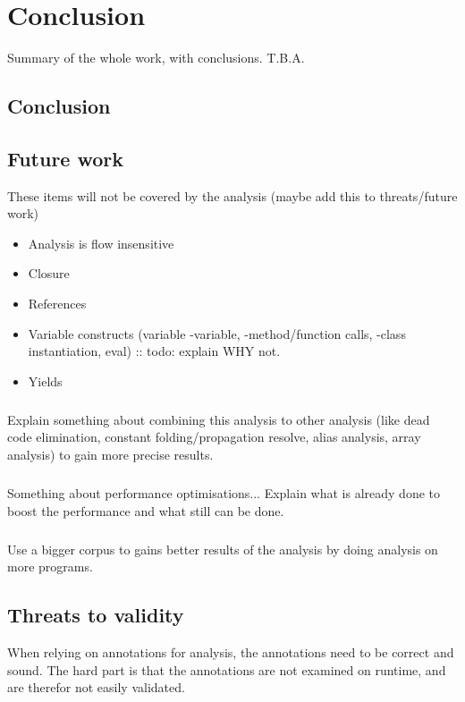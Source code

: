 \documentclass[main.tex]{subfiles}
\begin{document}
    \chapter{Conclusion}\label{chap:conclusion}
    Summary of the whole work, with conclusions. T.B.A.
    
    \section{Conclusion}
    
    \section{Future work}
    These items will not be covered by the analysis (maybe add this to threats/future work)
    \begin{itemize}
        \item Analysis is flow insensitive
        \item Closure
        \item References
        \item Variable constructs (variable -variable, -method/function calls, -class instantiation, eval) :: todo: explain WHY not.
        \item Yields
    \end{itemize}

    
    \paragraph{}
    Explain something about combining this analysis to other analysis (like dead code elimination, constant folding/propagation resolve, alias analysis, array analysis) to gain more precise results.
    
    \paragraph{}
    Something about performance optimisations... Explain what is already done to boost the performance and what still can be done.
        
    \paragraph{}
    Use a bigger corpus to gains better results of the analysis by doing analysis on more programs.
    
    \section{Threats to validity}
    When relying on annotations for analysis, the annotations need to be correct and sound.
    The hard part is that the annotations are not examined on runtime, and are therefor not easily validated.
\end{document}
